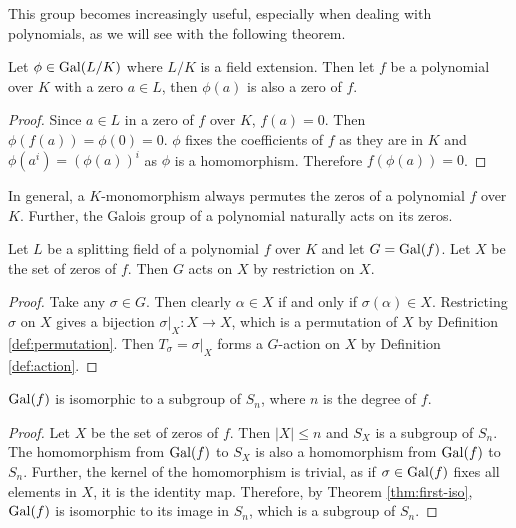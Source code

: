 This group becomes increasingly useful, especially when dealing with polynomials, as we will see with the following theorem.

\begin{theorem} \label{thm:galois-group-permutes-zeros}
Let $\phi \in \operatorname{Gal}(L/K)$ where $L/K$ is a field extension. Then let $f$ be a polynomial over $K$ with a zero $a \in L$, then $\phi(a)$ is also a zero of $f$.
\end{theorem}

\begin{proof}
    Since $a \in L$ in a zero of $f$ over $K$, $f(a) = 0$. Then $\phi(f(a)) = \phi(0) = 0$. $\phi$ fixes the coefficients of $f$ as they are in $K$ and $\phi\left(a^i\right) = \left(\phi(a) \right) ^i$ as $\phi$ is a homomorphism. Therefore $f(\phi(a)) = 0$. 
\end{proof}

In general, a $K$-monomorphism always permutes the zeros of a polynomial $f$ over $K$. Further, the Galois group of a polynomial naturally acts on its zeros.

\begin{theorem} \label{thm:galois-group-acts-on-zeros}
	Let $L$ be a splitting field of a polynomial $f$ over $K$ and let $G = \operatorname{Gal}(f)$. Let $X$ be the set of zeros of $f$. Then $G$ acts on $X$ by restriction on $X$. 
\end{theorem}

\begin{proof}
	Take any $\sigma \in G$. Then clearly $\alpha \in X$ if and only if $\sigma(\alpha) \in X$. Restricting $\sigma$ on $X$ gives a bijection $\sigma | _X : X \to X$, which is a permutation of $X$ by Definition \ref{def:permutation}. Then $T_\sigma  = \sigma | _X$ forms a $G$-action on $X$ by Definition \ref{def:action}.  
\end{proof}


\begin{corollary} \label{thm:galois-group-isomorphic-symmetric-subgroup}
	$\operatorname{Gal}(f)$ is isomorphic to a subgroup of $S_n$, where $n$ is the degree of $f$. 
\end{corollary}

\begin{proof}
	Let $X$ be the set of zeros of $f$. Then $|X| \le n$ and $S_X$ is a subgroup of $S_n$. The homomorphism from $\operatorname{Gal}(f)$ to $S_X$ is also a homomorphism from $\operatorname{Gal}(f)$ to $S_n$. Further, the kernel of the homomorphism is trivial, as if $\sigma \in \operatorname{Gal}(f)$ fixes all elements in $X$, it is the identity map. Therefore, by Theorem \ref{thm:first-iso}, $\operatorname{Gal}(f)$ is isomorphic to its image in $S_n$, which is a subgroup of $S_n$. 
\end{proof}

